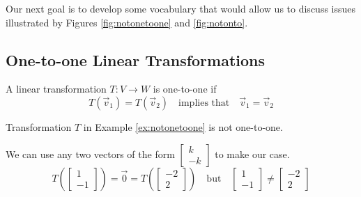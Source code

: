 \documentclass{ximera}
\begin{document}
Our next goal is to develop some vocabulary that would allow us to discuss issues illustrated by Figures \ref{fig:notonetoone} and \ref{fig:notonto}.

\subsection*{One-to-one Linear Transformations}

\begin{definition}\label{def:onetoone} A linear transformation $T:V\rightarrow W$ is one-to-one if 
$$T(\vec{v}_1)=T(\vec{v}_2)\quad \text{implies that}\quad \vec{v}_1=\vec{v}_2$$
\end{definition}

\begin{example}
Transformation $T$ in Example \ref{ex:notonetoone} is not one-to-one.
\begin{explanation}
We can use any two vectors of the form $\begin{bmatrix}k\\-k\end{bmatrix}$ to make our case.  
$$T\left(\begin{bmatrix}1\\-1\end{bmatrix}\right)=\vec{0}=T\left(\begin{bmatrix}-2\\2\end{bmatrix}\right)\quad \text{but}\quad\begin{bmatrix}1\\-1\end{bmatrix}\neq \begin{bmatrix}-2\\2\end{bmatrix}$$
\end{explanation}
\end{example}
\end{document}
